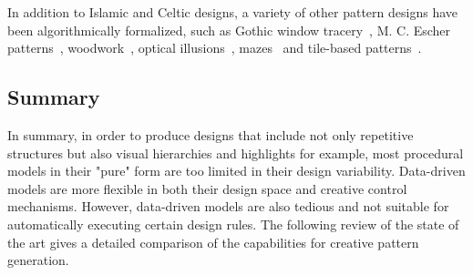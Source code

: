 In addition to Islamic and Celtic designs, a variety of other pattern designs have been algorithmically formalized, such as Gothic window tracery~\cite{havemann_2004_gpd}, M. C. Escher patterns~\cite{dunham_1981_crh,kaplan_2004_isp}, woodwork~\cite{gulati_2010_acp,gulati_2012_acp}, optical illusions~\cite{chi_2014_ois}, mazes~\cite{pedersen_2006_ola} and tile-based patterns~\cite{ouyang_2015_cat, gdawiec_2017_pga}.



\subsection{Summary}
\label{subsec:models_summary}

In summary, in order to produce designs that include not only repetitive structures but also visual hierarchies and highlights for example, most procedural models in their "pure" form are too limited in their design variability. Data-driven models are more flexible in both their design space and creative control mechanisms. However, data-driven models are also tedious and not suitable for automatically executing certain design rules. The following review of the state of the art gives a detailed comparison of the capabilities for creative pattern generation.